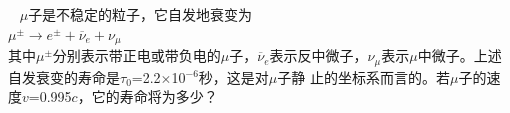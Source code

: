 \exercise ~ $\mu$子是不稳定的粒子，它自发地衰变为 \vspace{-0.2em} \\
\null\hspace{6em} $\mu ^ \pm \longrightarrow e ^ \pm + \overline{\nu} _ { e } + \nu _ { \mu }$ \vspace{-0.2em} \\
{其中\*$\mu ^ \pm$\*分别表示带正电或带负电的\*$\mu$\*子，\!$\overline{\nu} _ { e }$\*表示反中微子，\!$\nu _ { \mu}$\*表示$\mu$\*中微子。上述自发衰变的寿命是\*$ \tau _ { 0 }$=2.2$\times$10$^{-6}$\*秒，这是对\*$\mu$\*子静
止的坐标系而言的。\!若\*$\mu$\*子的速度\*$ v$=0.995$c$，\!它的寿命将为多少？}
